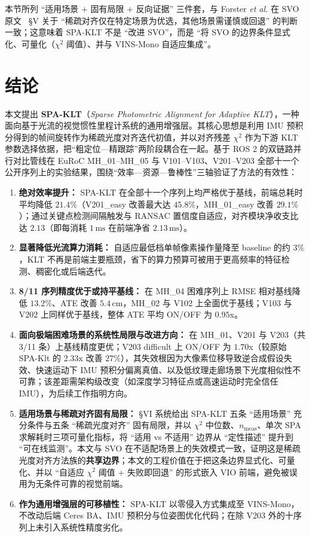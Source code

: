 \documentclass[letterpaper,journal]{IEEEtran}
\begin{document}
本节所列 ``适用场景 $+$ 固有局限 $+$ 反向证据'' 三件套，与 Forster \textit{et al.} 在 SVO 原文 ~§V 关于 ``稀疏对齐仅在特定场景为优选，其他场景需谨慎或回退'' 的判断一致；这意味着 SPA-KLT 不是 ``改进 SVO''，而是 ``将 SVO 的边界条件显式化、可量化（$\chi^2$ 阈值）、并与 VINS-Mono 自适应集成''。

\section{结论}
本文提出 \textbf{SPA-KLT}（\textit{Sparse Photometric Alignment for Adaptive KLT}），一种面向基于光流的视觉惯性里程计系统的通用增强层。其核心思想是利用 IMU 预积分得到的帧间旋转作为稀疏光度对齐迭代初值，并以对齐残差 $\chi^2$ 作为下游 KLT 参数选择依据，把``粗定位—精跟踪''两阶段耦合在一起。基于 ROS 2 的双链路并行对比管线在 EuRoC MH\_01--MH\_05 与 V101--V103、V201--V203 全部十一个公开序列上的实验结果，围绕``效率—资源—鲁棒性''三轴验证了方法的有效性：

\begin{enumerate}
\item \textbf{绝对效率提升：} SPA-KLT 在全部十一个序列上均严格优于基线，前端总耗时平均降低 $21.4\%$（V201\_easy 改善最大达 $45.8\%$，MH\_01\_easy 改善 $29.1\%$）；通过关键点检测间隔触发与 RANSAC 置信度自适应，对齐模块净收支比达 $2.13$（即每消耗 $1\,\mathrm{ms}$ 在前端净省 $2.13\,\mathrm{ms}$）。
\item \textbf{显著降低光流算力消耗：} 自适应最低档单帧像素操作量降至 baseline 的约 $3\%$，KLT 不再是前端主要瓶颈，省下的算力预算可被用于更高频率的特征检测、稠密化或后端迭代。
\item \textbf{8/11 序列精度优于或持平基线：} 在 MH\_04 困难序列上 RMSE 相对基线降低 $13.2\%$、ATE 改善 $5.4$\,cm，MH\_02 与 V102 上全面优于基线；V103 与 V202 上同样优于基线，整体 ATE 平均 ON/OFF 为 $0.95$x。
\item \textbf{面向极端困难场景的系统性局限与改进方向：} 在 MH\_01、V201 与 V203（共 3/11 条）上基线精度更优；V203 difficult 上 ON/OFF 为 $1.70$x（较原始 SPA-Klt 的 $2.33$x 改善 $27\%$），其失效根因为大像素位移导致逆合成假设失效、快速运动下 IMU 预积分偏离真值、以及低纹理走廊场景下光度相似性不可靠；该差距需架构级改变（如深度学习特征点或高速运动时完全信任 IMU），为后续工作指明方向。
\item \textbf{适用场景与稀疏对齐固有局限：} §VI 系统给出 SPA-KLT 五条 ``适用场景'' 充分条件与五条 ``稀疏光度对齐'' 固有局限，并以 $\chi^2$ 中位数、$n_{\mathrm{meas}}$、单次 SPA 求解耗时三项可量化指标，将 ``适用 vs 不适用'' 边界从 ``定性描述'' 提升到 ``可在线监测''。本文与 SVO 在不适配场景上的失效模式一致，证明这是稀疏光度对齐方法族的\textbf{共享边界}；本文的工程价值在于把这条边界显式化、可量化、并以 ``自适应 $\chi^2$ 阈值 $+$ 失败即回退'' 的形式嵌入 VIO 前端，避免被误用为无条件可靠的视觉前端。
\item \textbf{作为通用增强层的可移植性：} SPA-KLT 以零侵入方式集成至 VINS-Mono，不改动后端 Ceres BA、IMU 预积分与位姿图优化代码；在除 V203 外的十序列上未引入系统性精度劣化。
\end{enumerate}
\end{document}
